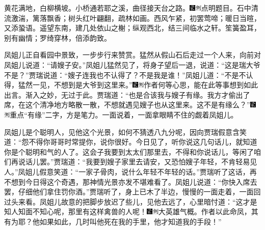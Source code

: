 黄花满地，白柳横坡。小桥通若耶之溪，曲径接天台之路。{\includegraphics[width=3mm]{../Images/00006}\includegraphics[width=3mm]{../Images/00011}\footnotesize \kaishu 点明题目。}石中清流激湍，篱落飘香；树头红叶翩翻，疏林如画。西风乍紧，初罢莺啼；暖日当暄，又添蛩语。遥望东南，建几处依山之榭；纵观西北，结三间临水之轩。笙簧盈耳，别有幽情；罗绮穿林，倍添韵致。

凤姐儿正自看园中景致，一步步行来赞赏。猛然从假山石后走过一个人来，向前对凤姐儿说道：``请嫂子安。''凤姐儿猛然见了，将身子望后一退，说道：``这是瑞大爷不是？''贾瑞说道：``嫂子连我也不认得了？不是我是谁！''凤姐儿道：``不是不认得，猛然一见，不想到是大爷到这里来。''{\includegraphics[width=3mm]{../Images/00006}\includegraphics[width=3mm]{../Images/00011}\footnotesize \kaishu 作者何等心思，能在此等事想到如此出言。渐入之妙，无过于此。}贾瑞道：``也是合该我与嫂子有缘。我方才偷出了席，在这个清净地方略散一散，不想就遇见嫂子也从这里来。这不是有缘么？''{\includegraphics[width=3mm]{../Images/00006}\includegraphics[width=3mm]{../Images/00011}\footnotesize \kaishu 重点``有缘''二字，方是笔力。}一面说着，一面拿眼睛不住的觑着凤姐儿。

凤姐儿是个聪明人，见他这个光景，如何不猜透八九分呢，因向贾瑞假意含笑道：``怨不得你哥哥时常提你，说你很好。今日见了，听你说这几句话儿，就知道你是个聪明和气的人了。这会子我要到太太们那里去，不得和你说话儿，等闲了咱们再说话儿罢。''贾瑞道：``我要到嫂子家里去请安，又恐怕嫂子年轻，不肯轻易见人。''凤姐儿假意笑道：``一家子骨肉，说什么年轻不年轻的话。''贾瑞听了这话，再不想到今日得这个奇遇，那神情光景亦发不堪难看了。凤姐儿说道：``你快入席去罢，仔细他们拿住罚你酒。''贾瑞听了，身上已木了半边，慢慢的一面走着，一面回过头来看。凤姐儿故意的把脚步放迟了些儿，见他去远了，心里暗忖道：``这才是知人知面不知心呢，那里有这样禽兽的人呢！{\includegraphics[width=3mm]{../Images/00006}\includegraphics[width=3mm]{../Images/00011}\footnotesize \kaishu 大英雄气概。作者以此命凤，其有为耶？}他如果如此，几时叫他死在我的手里，他才知道我的手段！''

